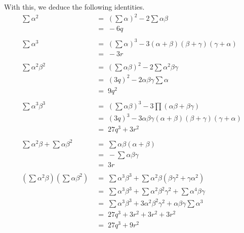 \documentclass[10pt]{article}
\begin{document}
        With this, we deduce the following identities.
        \begin{align*}
                \sum \alpha^2 \;&=\; \left(\sum\alpha\right)^2 - 2\sum\alpha\beta \\
                        \;&=\; -6q \\
                \\
                \sum \alpha^3 \;&=\; \left(\sum\alpha\right)^3 - 3(\alpha + \beta)(\beta + \gamma)(\gamma + \alpha)\\
                        \;&=\; -3r \\
                \\
                \sum \alpha^2\beta^2 \;&=\ \left(\sum \alpha\beta\right)^2 - 2\sum \alpha^2\beta\gamma \\
                        \;&=\; (3q)^2 - 2\alpha\beta\gamma\sum\alpha \\
                        \;&=\; 9q^2 \\
                \\
                \sum \alpha^3\beta^3 \;&=\; \left(\sum \alpha \beta\right)^3 - 3\prod(\alpha\beta + \beta\gamma) \\
                        \;&=\; (3q)^3 - 3\alpha\beta\gamma(\alpha + \beta)(\beta + \gamma)(\gamma + \alpha) \\
                        \;&=\; 27q^3 + 3r^2\\
                \\
                \sum\alpha^2\beta + \sum\alpha\beta^2 \;&=\; \sum \alpha\beta(\alpha + \beta) \\
                        \;&=\; -\sum\alpha\beta\gamma \\
                        \;&=\; 3r \\
                \\
                \left(\sum\alpha^2\beta\right)\left(\sum\alpha\beta^2\right)
                        \;&=\; \sum\alpha^3\beta^3 + \sum\alpha^2\beta(\beta\gamma^2 + \gamma\alpha^2) \\
                        \;&=\; \sum\alpha^3\beta^3 + \sum\alpha^2\beta^2\gamma^2 + \sum\alpha^4\beta\gamma \\
                        \;&=\; \sum\alpha^3\beta^3 + 3\alpha^2\beta^2\gamma^2 + \alpha\beta\gamma\sum\alpha^3 \\
                        \;&=\; 27q^3 + 3r^2 + 3r^2 + 3r^2 \\
                        \;&=\; 27q^3 + 9r^2 \\

\end{align*}
\end{document}
